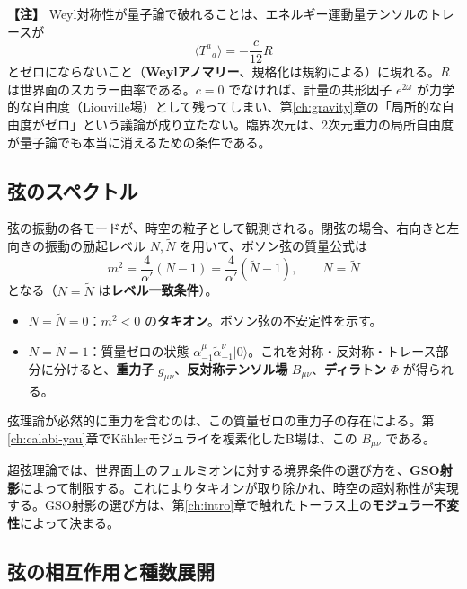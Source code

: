 \documentclass[uplatex, dvipdfmx, book]{jsbook}
\let\origsubsection\subsection
\let\origsubsubsection\subsubsection
\renewcommand{\section}{\origsubsection}
\renewcommand{\subsection}{\origsubsubsection}
\renewcommand{\subsubsection}{\paragraph}
\newenvironment{note}{\vspace{1ex}\par\footnotesize\noindent\textbf{【注】}}{\par\vspace{1ex}}
\begin{document}
\begin{note}
Weyl対称性が量子論で破れることは、エネルギー運動量テンソルのトレースが
\begin{equation*}
    \langle T^a{}_a \rangle = -\frac{c}{12}R
\end{equation*}
とゼロにならないこと（\textbf{Weylアノマリー}、規格化は規約による）に現れる。$R$ は世界面のスカラー曲率である。$c = 0$ でなければ、計量の共形因子 $e^{2\omega}$ が力学的な自由度（Liouville場）として残ってしまい、第\ref{ch:gravity}章の「局所的な自由度がゼロ」という議論が成り立たない。臨界次元は、2次元重力の局所自由度が量子論でも本当に消えるための条件である。
\end{note}

\section{弦のスペクトル}

弦の振動の各モードが、時空の粒子として観測される。閉弦の場合、右向きと左向きの振動の励起レベル $N, \tilde{N}$ を用いて、ボソン弦の質量公式は
\begin{equation}
    m^2 = \frac{4}{\alpha'}(N - 1) = \frac{4}{\alpha'}(\tilde{N} - 1), \qquad N = \tilde{N}
\end{equation}
となる（$N = \tilde{N}$ は\textbf{レベル一致条件}）。
\begin{itemize}
    \item $N = \tilde{N} = 0$：$m^2 < 0$ の\textbf{タキオン}。ボソン弦の不安定性を示す。
    \item $N = \tilde{N} = 1$：質量ゼロの状態 $\alpha^\mu_{-1}\tilde{\alpha}^\nu_{-1}|0\rangle$。これを対称・反対称・トレース部分に分けると、\textbf{重力子} $g_{\mu\nu}$、\textbf{反対称テンソル場} $B_{\mu\nu}$、\textbf{ディラトン} $\Phi$ が得られる。
\end{itemize}
弦理論が必然的に重力を含むのは、この質量ゼロの重力子の存在による。第\ref{ch:calabi-yau}章でK\"ahlerモジュライを複素化したB場は、この $B_{\mu\nu}$ である。

超弦理論では、世界面上のフェルミオンに対する境界条件の選び方を、\textbf{GSO射影}によって制限する。これによりタキオンが取り除かれ、時空の超対称性が実現する。GSO射影の選び方は、第\ref{ch:intro}章で触れたトーラス上の\textbf{モジュラー不変性}によって決まる。

\section{弦の相互作用と種数展開}
\end{document}

